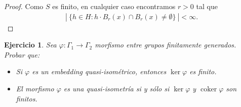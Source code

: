 \documentclass[11pt]{article}
\theoremstyle{colored}
\newtheorem{exercise}{Ejercicio}
\newcommand{\coker}{\operatorname{coker}}
\begin{document}
\begin{proof}
Como $S$ es finito, en cualquier caso encontramos $r > 0$ tal que 
\begin{align*}
| \ \{h \in H : h \cdot B_r(x) \cap B_r(x) \neq \emptyset \} \ | < \infty.
\end{align*}
\end{proof}

\setcounter{exercise}{5}
\begin{exercise} Sea $\varphi : \Gamma_1 \to \Gamma_2$ morfismo entre grupos finitamente generados. Probar que:
\begin{itemize}
\item[a)] Si $\varphi$ es un embedding quasi-isométrico, entonces $\ker \varphi$ es finito.
\item[b)] El morfismo $\varphi$ es una quasi-isometría si y sólo si $\ker \varphi$ y $\coker \varphi$ son finitos.
\end{itemize}
\end{exercise}
\end{document}
